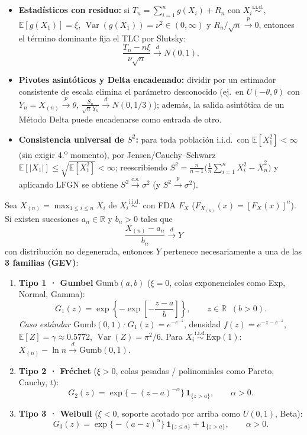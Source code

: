 \documentclass[10pt,a4paper]{article}
\newcommand{\E}{\mathbb{E}}
\newcommand{\R}{\mathbb{R}}
\newcommand{\Var}{\operatorname{Var}}
\newcommand{\iid}{\overset{\text{i.i.d.}}{\sim}}
\newcommand{\dto}{\xrightarrow{\;d\;}}
\newcommand{\pto}{\xrightarrow{\;p\;}}
\newcommand{\dcs}{\xrightarrow{\mathrm{c.s.}}}
\begin{document}
\begin{thmbox}[frametitle={Estadísticos con residuo, pivotes asintóticos y consistencia universal de $S^2$}]
\begin{itemize}
  \item \textbf{Estadísticos con residuo:} si $T_n = \sum_{i=1}^n g(X_i) + R_n$ con $X_i \iid$, $\E[g(X_1)] = \xi$, $\Var(g(X_1)) = \nu^2 \in (0,\infty)$ y $R_n/\sqrt{n} \pto 0$, entonces el término dominante fija el TLC por Slutsky:
  \[
  \frac{T_n - n\xi}{\nu\sqrt{n}} \dto N(0,1).
  \]
  \item \textbf{Pivotes asintóticos y Delta encadenado:} dividir por un estimador consistente de escala elimina el parámetro desconocido (ej.\ en $U(-\theta,\theta)$ con $Y_n = X_{(n)} \pto \theta$, $\frac{S_n}{\sqrt{n}\,Y_n} \dto N(0, 1/3)$); además, la salida asintótica de un Método Delta puede encadenarse como entrada de otro.
  \item \textbf{Consistencia universal de $S^2$:} para toda población i.i.d.\ con $\E[X_1^2] < \infty$ (sin exigir 4.\textsuperscript{o} momento), por Jensen/Cauchy--Schwarz $\E[|X_1|] \le \sqrt{\E[X_1^2]} < \infty$; reescribiendo $S^2 = \frac{n}{n-1}\big(\frac{1}{n}\sum_{i=1}^n X_i^2 - \bar X_n^2\big)$ y aplicando LFGN se obtiene $S^2 \dcs \sigma^2$ (y $S^2 \pto \sigma^2$).
\end{itemize}
\end{thmbox}

\begin{thmbox}[frametitle={Teoría del Valor Extremo (TVE · Fisher--Tippett--Gnedenko)}]
Sea $X_{(n)} = \max_{1\le i\le n} X_i$ de $X_i \iid$ con FDA $F_X$ ($F_{X_{(n)}}(x) = [F_X(x)]^n$). Si existen sucesiones $a_n \in \R$ y $b_n > 0$ tales que
\[
\frac{X_{(n)} - a_n}{b_n} \dto Y
\]
con distribución no degenerada, entonces $Y$ pertenece necesariamente a una de las \textbf{3 familias (GEV)}:
\begin{enumerate}
  \item \textbf{Tipo 1 · Gumbel} $\text{Gumb}(a,b)$ ($\xi = 0$, colas exponenciales como Exp, Normal, Gamma):
  \[
  G_1(z) = \exp\!\left\{-\exp\!\left[-\frac{z - a}{b}\right]\right\}, \qquad z \in \R \;\;(b > 0).
  \]
  \textit{Caso estándar $\text{Gumb}(0,1)$:} $G_1(z) = e^{-e^{-z}}$, densidad $f(z) = e^{-z-e^{-z}}$, $\E[Z] = \gamma \approx 0.5772$, $\Var(Z) = \pi^2/6$. Para $X_i \iid \text{Exp}(1)$: $X_{(n)} - \ln n \dto \text{Gumb}(0,1)$.
  \item \textbf{Tipo 2 · Fréchet} ($\xi > 0$, colas pesadas / polinomiales como Pareto, Cauchy, $t$):
  \[
  G_2(z) = \exp\!\big\{-(z - a)^{-\alpha}\big\}\,\mathbf{1}_{\{z > a\}}, \qquad \alpha > 0.
  \]
  \item \textbf{Tipo 3 · Weibull} ($\xi < 0$, soporte acotado por arriba como $U(0,1)$, Beta):
  \[
  G_3(z) = \exp\!\big\{-(a - z)^{\alpha}\big\}\,\mathbf{1}_{\{z \le a\}} + \mathbf{1}_{\{z > a\}}, \qquad \alpha > 0.
  \]
\end{enumerate}
\end{thmbox}
\end{document}
